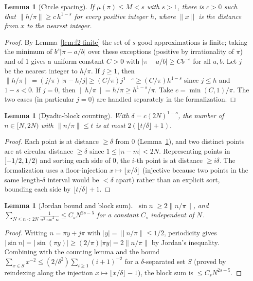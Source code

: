 \documentclass[11pt]{amsart}
\newtheorem{lemma}[theorem]{Lemma}
\theoremstyle{definition}
\theoremstyle{remark}
\numberwithin{equation}{section}
\newcommand{\irr}{\mu}
\begin{document}
\begin{lemma}[Circle spacing]\label{lem:f2-spacing}
If $\irr(\pi)\le M<s$ with $s>1$, there is $c>0$ such that $\|h/\pi\|\ge c\,h^{1-s}$ for every positive integer $h$, where $\|x\|$ is the distance from $x$ to the nearest integer.
\end{lemma}
\begin{proof}
By Lemma~\ref{lem:f2-finite} the set of $s$-good approximations is finite; taking the minimum of $b^s|\pi-a/b|$ over these exceptions (positive by irrationality of $\pi$) and of $1$ gives a uniform constant $C>0$ with $|\pi-a/b|\ge C b^{-s}$ for all $a,b$. Let $j$ be the nearest integer to $h/\pi$. If $j\ge1$, then $\|h/\pi\|=(j/\pi)|\pi-h/j|\ge(C/\pi)j^{1-s}\ge(C/\pi)h^{1-s}$ since $j\le h$ and $1-s<0$. If $j=0$, then $\|h/\pi\|=h/\pi\ge h^{1-s}/\pi$. Take $c=\min(C,1)/\pi$. The two cases (in particular $j=0$) are handled separately in the formalization.
\end{proof}

\begin{lemma}[Dyadic-block counting]\label{lem:f2-count}
With $\delta=c(2N)^{1-s}$, the number of $n\in[N,2N)$ with $\|n/\pi\|\le t$ is at most $2(\lfloor t/\delta\rfloor+1)$.
\end{lemma}
\begin{proof}
Each point is at distance $\ge\delta$ from $0$ (Lemma~\ref{lem:f2-spacing}), and two distinct points are at circular distance $\ge\delta$ since $1\le|n-m|<2N$. Representing points in $[-1/2,1/2)$ and sorting each side of $0$, the $i$-th point is at distance $\ge i\delta$. The formalization uses a floor-injection $x\mapsto\lfloor x/\delta\rfloor$ (injective because two points in the same length-$\delta$ interval would be $<\delta$ apart) rather than an explicit sort, bounding each side by $\lfloor t/\delta\rfloor+1$.
\end{proof}

\begin{lemma}[Jordan bound and block sum]\label{lem:f2-blocksum}
$|\sin n|\ge2\|n/\pi\|$, and $\sum_{N\le n<2N}\frac1{n^3\sin^2 n}\le C_s N^{2s-5}$ for a constant $C_s$ independent of $N$.
\end{lemma}
\begin{proof}
Writing $n=\pi y+j\pi$ with $|y|=\|n/\pi\|\le1/2$, periodicity gives $|\sin n|=|\sin(\pi y)|\ge(2/\pi)|\pi y|=2\|n/\pi\|$ by Jordan's inequality. Combining with the counting lemma and the bound $\sum_{x\in S}x^{-2}\le(2/\delta^2)\sum_{i\ge1}(i+1)^{-2}$ for a $\delta$-separated set $S$ (proved by reindexing along the injection $x\mapsto\lfloor x/\delta\rfloor-1$), the block sum is $\le C_s N^{2s-5}$.
\end{proof}
\end{document}
